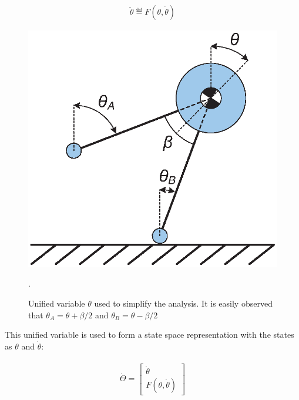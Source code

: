 \begin{equation}  
	\begin{aligned}
		\ddot{\theta} \eqdef F(\theta, \dot{\theta})
	\end{aligned}
\end{equation}

\begin{figure}[!t]
	\centering
    \includegraphics[scale=0.7]{fig/fpe/fig3.eps} 
  	\caption{Unified variable $\theta$ used to simplify the analysis. It is easily observed that $\theta_A = \theta  + \beta /2$ and $\theta_B = \theta  - \beta /2$}.
	\label{fig:unified}
\end{figure}

This unified variable is used to form a state space representation with the states as $\theta$ and $\dot{\theta}$: 

\begin{equation} \label{ss}
	\begin{aligned}
				\begin{gathered}
  			\dot{\Theta} = \left[ {\begin{array}{*{20}{c}}
  {\dot \theta } \\ 
  {F(\theta, \dot{\theta})} 
							   \end{array}} \right]
		\end{gathered}
	\end{aligned}
\end{equation}

